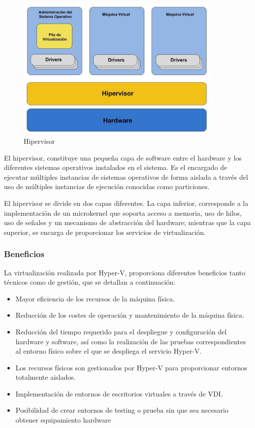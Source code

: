 \documentclass[preprint,12pt]{elsarticle}
\begin{document}
\begin{figure}[htb]
	\begin{center}
		\includegraphics[width=10cm]{./IMAGENES/Hyper-v} 
		\caption{Hipervisor}
	\end{center}
\end{figure}
El hipervisor, constituye una pequeña capa de software entre el hardware y los diferentes sistemas operativos instalados en el sistema. Es el encargado de ejecutar múltiples instancias de sistemas operativos de forma aislada a través del uso de múltiples instancias de ejecución conocidas como particiones.

El hipervisor se divide en dos capas diferentes. La capa inferior, corresponde a la implementación de un microkernel que soporta acceso a memoria, uso de hilos, uso de señales y un mecanismo de abstracción del hardware; mientras que la capa superior, se encarga de proporcionar los servicios de virtualización.\cite{Hyperv2019}

\subsubsection{\textbf{Beneficios}}
La virtualización realizada por Hyper-V, proporciona diferentes beneficios tanto técnicos como de gestión, que
se detallan a continuación:
\begin{itemize}
\item Mayor eficiencia de los recursos de la máquina física.
\item Reducción de los costes de operación y mantenimiento de la máquina física.
\item Reducción del tiempo requerido para el despliegue y configuración del hardware y software, así como la
realización de las pruebas correspondientes al entorno físico sobre el que se despliega el servicio Hyper-V.
\item Los recursos físicos son gestionados por Hyper-V para proporcionar entornos totalmente aislados.
\item Implementación de entornos de escritorios virtuales a través de VDI.
\item Posibilidad de crear entornos de testing o prueba sin que sea necesario obtener equipamiento hardware
\end{itemize}
\cite{Hyperv2019}
\end{document}
